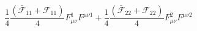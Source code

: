 \begin{equation}
\frac{1}{4}\frac{(\bar{\mathcal{F}}_{11}+\mathcal{F}_{11})}{4}
F_{\mu\nu}^{1}F^{\mu\nu 1} +
\frac{1}{4}\frac{(\bar{\mathcal{F}}_{22}+\mathcal{F}_{22})}{4}
F_{\mu\nu}^{2}F^{\mu\nu 2}
\end{equation}

